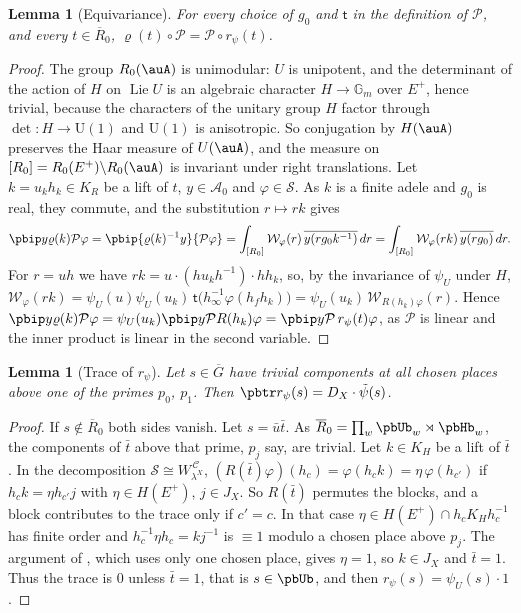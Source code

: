\documentclass[10pt]{amsart}
\newtheorem{lemma}[theorem]{Lemma}
\theoremstyle{definition}
\theoremstyle{remark}
\providecommand{\auAz}{\mathcal A_0}
\providecommand{\auDX}{D_X}
\providecommand{\auG}{\overline G}
\providecommand{\auP}{\mathcal P}
\providecommand{\auS}{\mathcal S}
\providecommand{\auU}{\mathrm U}
\providecommand{\aubar}[1]{\overline{#1}}
\providecommand{\pbR}{\overline R_0}
\providecommand{\pbrpsi}{r_\psi}
\begin{document}
\begin{lemma}[Equivariance]\label{pb:equiv}
For every choice of $g_0$ and $\mathsf t$ in the definition of $\auP$, and every $t\in\pbR$,
$\varrho(t)\circ\auP=\auP\circ\pbrpsi(t)$.
\end{lemma}
\begin{proof}
The group $R_0(\auA)$ is unimodular: $U$ is unipotent, and the determinant of the action of $H$
on $\operatorname{Lie}U$ is an algebraic character $H\to\mathbb G_m$ over $E^+$, hence trivial,
because the characters of the unitary group $H$ factor through $\det\colon H\to\auU(1)$ and
$\auU(1)$ is anisotropic. So conjugation by $H(\auA)$ preserves the Haar measure of $U(\auA)$, and
the measure on $[R_0]=R_0(E^+)\backslash R_0(\auA)$ is invariant under right
translations. Let $k=u_kh_k\in K_R$ be a lift of $t$, $y\in\auAz$ and $\varphi\in\auS$. As $k$ is
a finite adele and $g_0$ is real, they commute, and the substitution $r\mapsto rk$ gives
\[
\pbip y{\varrho(k)\auP\varphi}=\pbip{\varrho(k)^{-1}y}{\auP\varphi}=\int_{[R_0]}\mathcal W_\varphi(r)
\,\aubar{y(rg_0k^{-1})}\,dr=\int_{[R_0]}\mathcal W_\varphi(rk)\,\aubar{y(rg_0)}\,dr .
\]
For $r=uh$ we have $rk=u\cdot(hu_kh^{-1})\cdot hh_k$, so, by the invariance of $\psi_U$ under $H$,
$\mathcal W_\varphi(rk)=\psi_U(u)\psi_U(u_k)\,\mathsf t\bigl(h_\infty^{-1}\varphi(h_fh_k)\bigr)=
\psi_U(u_k)\,\mathcal W_{R(h_k)\varphi}(r)$. Hence $\pbip y{\varrho(k)\auP\varphi}=\psi_U(u_k)\pbip y
{\auP R(h_k)\varphi}=\pbip y{\auP\,\pbrpsi(t)\varphi}$, as $\auP$ is linear and the inner product is
linear in the second variable.
\end{proof}

\begin{lemma}[Trace of $\pbrpsi$]\label{pb:trace}
Let $s\in\auG$ have trivial components at all chosen places above one of the primes $p_0$, $p_1$.
Then $\pbtr\pbrpsi(s)=\auDX\cdot\tilde\psi(s)$.
\end{lemma}
\begin{proof}
If $s\notin\pbR$ both sides vanish. Let $s=\bar u\bar t$. As $\pbR=\prod_w\pbUb_w\rtimes\pbHb_w$,
the components of $\bar t$ above that prime, $p_j$ say, are trivial. Let $k\in K_H$ be a lift of
$\bar t$. In the decomposition $\auS\cong W_{\lambda^X}^{\,\mathcal C}$, $(R(\bar t)\varphi)(h_c)=
\varphi(h_ck)=\eta\,\varphi(h_{c'})$ if $h_ck=\eta h_{c'}j$ with $\eta\in H(E^+)$, $j\in J_X$. So
$R(\bar t)$ permutes the blocks, and a block contributes to the trace only if $c'=c$. In that case
$\eta\in H(E^+)\cap h_cK_Hh_c^{-1}$ has finite order and $h_c^{-1}\eta h_c=kj^{-1}$ is $\equiv1$
modulo a chosen place above $p_j$. The argument of {\cite[Lemma~14.5]{P46}}, which uses only one chosen
place, gives $\eta=1$, so $k\in J_X$ and $\bar t=1$. Thus the trace is $0$ unless $\bar t=1$, that
is $s\in\pbUb$, and then $\pbrpsi(s)=\psi_U(s)\cdot1$.
\end{proof}
\end{document}
